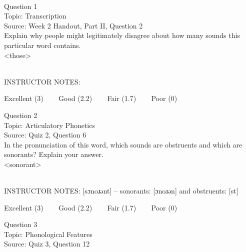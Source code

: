 \documentclass[12pt]{article}
\begin{document}
\begin{center}
\textbf{{\color{red}{\HUGE END OF EXAM}}}\\

\end{center}
\newpage

\begin{center}
\textbf{{\color{blue}{\HUGE START OF EXAM\\}}}

\textbf{{\color{blue}{\HUGE Student ID: 35405\\}}}

\textbf{{\color{blue}{\HUGE \\}}}

\end{center}
\newpage

{\large Question 1}\\

Topic: Transcription\\
Source: Week 2 Handout, Part II, Question 2\\

Explain why people might legitimately disagree about how many sounds this particular word contains.\\

<those>


~\\
INSTRUCTOR NOTES: 


\vfill
Excellent (3) ~~~ Good (2.2) ~~~ Fair (1.7) ~~~ Poor (0)
\newpage

{\large Question 2}\\

Topic: Articulatory Phonetics\\
Source: Quiz 2, Question 6\\

In the pronunciation of this word, which sounds are obstruents and which are sonorants? Explain your answer.\\

<sonorant>


~\\
INSTRUCTOR NOTES: [sɔnoɹənt] -- sonorants: [ɔnoɹən] and obstruents: [st]


\vfill
Excellent (3) ~~~ Good (2.2) ~~~ Fair (1.7) ~~~ Poor (0)
\newpage

{\large Question 3}\\

Topic: Phonological Features\\
Source: Quiz 3, Question 12\\
\end{document}
